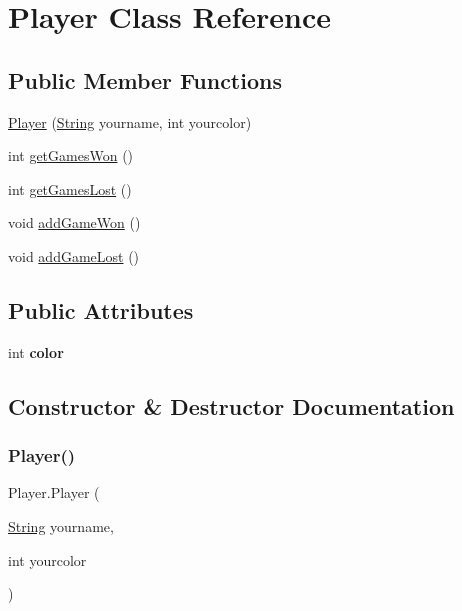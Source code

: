 \hypertarget{class_player}{}\section{Player Class Reference}
\label{class_player}
\subsection*{Public Member Functions}
\begin{DoxyCompactItemize}
\item 
\mbox{\hyperlink{class_player_a128c93dfe2792d0736d796f2af8ae023}{Player}} (\mbox{\hyperlink{class_string}{String}} yourname, int yourcolor)
\item 
int \mbox{\hyperlink{class_player_acf4f38580e99a50f903ce88cf3144e7a}{get\+Games\+Won}} ()
\item 
int \mbox{\hyperlink{class_player_a108c087a123e224e744bf10755c1bf1e}{get\+Games\+Lost}} ()
\item 
void \mbox{\hyperlink{class_player_a8be574b1b809fa4655039c64ab5c36ee}{add\+Game\+Won}} ()
\item 
void \mbox{\hyperlink{class_player_a72bc43f3b577a89100f9527442f9e040}{add\+Game\+Lost}} ()
\end{DoxyCompactItemize}
\subsection*{Public Attributes}
\begin{DoxyCompactItemize}
\item 
\mbox{\label{class_player_ae01ab455becb5ed166101b78787a27e4}} 
int {\bfseries color}
\end{DoxyCompactItemize}


\subsection{Constructor \& Destructor Documentation}
\mbox{\label{class_player_a128c93dfe2792d0736d796f2af8ae023}} 
\subsubsection{\texorpdfstring{Player()}{Player()}}
{\footnotesize\ttfamily Player.\+Player (\begin{DoxyParamCaption}\item[{\mbox{\hyperlink{class_string}{String}}}]{yourname,  }\item[{int}]{yourcolor }\end{DoxyParamCaption})\hspace{0.3cm}{\ttfamily [inline]}}

